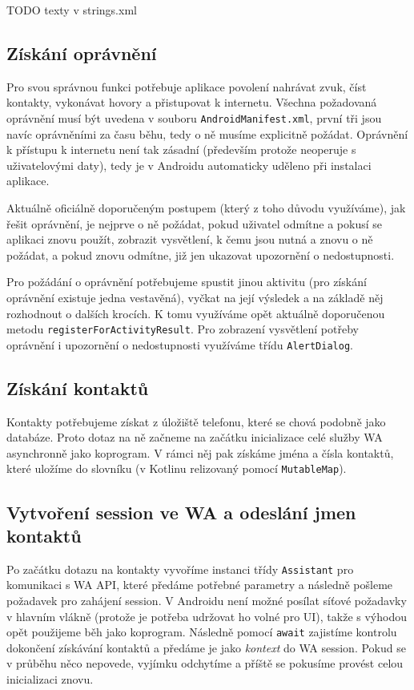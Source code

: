 TODO texty v strings.xml

\subsection{Získání oprávnění}

Pro svou správnou funkci potřebuje aplikace povolení nahrávat zvuk, číst
kontakty, vykonávat hovory a přistupovat k internetu. Všechna požadovaná
oprávnění musí být uvedena v souboru \texttt{AndroidManifest.xml}, první
tři jsou navíc oprávněními za času běhu, tedy o ně musíme explicitně
požádat. Oprávnění k přístupu k internetu není tak zásadní (především
protože neoperuje s uživatelovými daty), tedy je v Androidu automaticky
uděleno při instalaci aplikace.

Aktuálně oficiálně doporučeným postupem (který z toho důvodu využíváme), jak
řešit oprávnění, je nejprve o ně požádat, pokud uživatel odmítne a pokusí se
aplikaci znovu použít, zobrazit vysvětlení, k čemu jsou nutná a znovu o ně
požádat, a pokud znovu odmítne, již jen ukazovat upozornění o nedostupnosti.

Pro požádání o oprávnění potřebujeme spustit jinou aktivitu (pro získání
oprávnění existuje jedna vestavěná), vyčkat na její výsledek a na základě
něj rozhodnout o dalších krocích. K tomu využíváme opět aktuálně doporučenou
metodu \texttt{registerForActivityResult}. Pro zobrazení vysvětlení potřeby
oprávnění i upozornění o nedostupnosti využíváme třídu \texttt{AlertDialog}.

\subsection{Získání kontaktů}

Kontakty potřebujeme získat z úložiště telefonu, které se chová podobně jako
databáze. Proto dotaz na ně začneme na začátku inicializace celé služby WA
asynchronně jako koprogram. V rámci něj pak získáme jména a čísla kontaktů,
které uložíme do slovníku (v Kotlinu relizovaný pomocí \texttt{MutableMap}).

\subsection{Vytvoření session ve WA a odeslání jmen kontaktů}

Po začátku dotazu na kontakty vyvoříme instanci třídy \texttt{Assistant}
pro komunikaci s WA API, které předáme potřebné parametry a následně pošleme
požadavek pro zahájení session. V Androidu není možné posílat síťové požadavky
v hlavním vlákně (protože je potřeba udržovat ho volné pro UI), takže s výhodou
opět použijeme běh jako koprogram. Následně pomocí \texttt{await} zajistíme
kontrolu dokončení získávání kontaktů a předáme je jako \textit{kontext} do
WA session. Pokud se v průběhu něco nepovede, vyjímku odchytíme a příště
se pokusíme provést celou inicializaci znovu.


